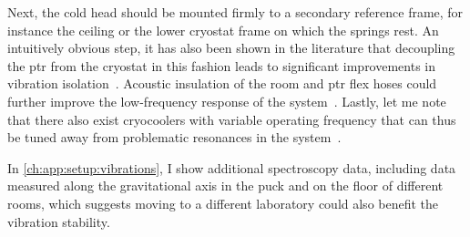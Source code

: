 Next, the cold head should be mounted firmly to a secondary reference frame, for instance the ceiling or the lower cryostat frame on which the springs rest.
An intuitively obvious step, it has also been shown in the literature that decoupling the \gls{ptr} from the cryostat in this fashion leads to significant improvements in vibration isolation~\cite{Olivieri2017}.
Acoustic insulation of the room and \gls{ptr} flex hoses could further improve the low-frequency response of the system~\cite{Schmoranzer2019,Oh2021}.
Lastly, let me note that there also exist cryocoolers with variable operating frequency that can thus be tuned away from problematic resonances in the system~.


In \cref{ch:app:setup:vibrations}, I show additional spectroscopy data, including data measured along the gravitational axis in the puck and on the floor of different rooms, which suggests moving to a different laboratory could also benefit the vibration stability.

\cite{Caparrelli2006,Pelliccione2013}
